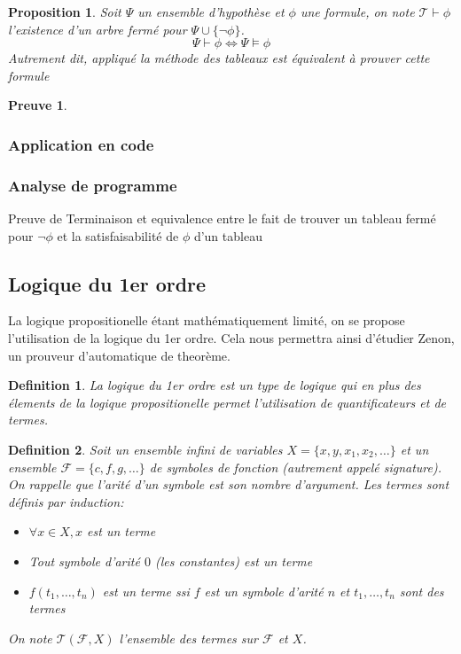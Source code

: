 \documentclass{paper}
\newtheorem{prop}{Proposition}
\newtheorem{defi}{Definition}
\newtheorem{preuve}{Preuve}
\begin{document}
\begin{prop}
    Soit $\Psi$ un ensemble d'hypothèse et $\phi$ une formule, on note $\mathcal{T}\vdash\phi$ l'existence d'un arbre fermé pour $\Psi\cup\{\lnot\phi\}$.
    $$\Psi\vdash\phi \Leftrightarrow \Psi\vDash\phi$$
    Autrement dit, appliqué la méthode des tableaux est équivalent à prouver cette formule
\end{prop}

\begin{preuve}
\end{preuve}

\subsubsection{Application en code}

\subsubsection{Analyse de programme}
Preuve de Terminaison et equivalence entre le fait de trouver un tableau fermé pour $\lnot\phi$ et la satisfaisabilité de $\phi$ d'un tableau




\subsection{Logique du 1er ordre}
La logique propositionelle étant mathématiquement limité, on se propose l'utilisation de la logique du 1er ordre.
Cela nous permettra ainsi d'étudier Zenon, un prouveur d'automatique de theorème.
\begin{defi}
    La \textit{logique du 1er ordre} est un type de logique qui en plus des élements de la logique propositionelle permet l'utilisation de
    quantificateurs et de \textit{termes}.
\end{defi}

\begin{defi}
    Soit un ensemble infini de variables $X = \{x,y,x_1,x_2,\dots \}$ et un ensemble $\mathcal{F}=\{c,f,g,\dots \}$ de symboles de fonction (autrement appelé signature).
    On rappelle que l'arité d'un symbole est son nombre d'argument.
    Les termes sont définis par induction:
    \begin{itemize}
        \item $\forall x\in X, x$ est un terme
        \item Tout symbole d'arité $0$ (les constantes) est un terme
        \item $f(t_1,\dots,t_n)$ est un terme ssi $f$ est un symbole d'arité $n$ et $t_1,\dots,t_n$ sont des termes
    \end{itemize} 
    On note $\mathcal{T}(\mathcal{F}, X)$ l'ensemble des termes sur $\mathcal{F}$ et $X$.
\end{defi}
\end{document}

